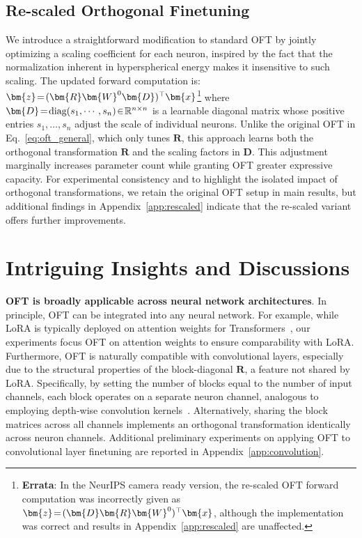 \subsection{Re-scaled Orthogonal Finetuning}

We introduce a straightforward modification to standard OFT by jointly optimizing a scaling coefficient for each neuron, inspired by the fact that the normalization inherent in hyperspherical energy makes it insensitive to such scaling. The updated forward computation is: $\thickmuskip=2mu \medmuskip=2mu\bm{z}=(\bm{R}\bm{W}^0\bm{D})^\top\bm{x}$\footnote{\textbf{Errata}: In the NeurIPS camera ready version, the re-scaled OFT forward computation was incorrectly given as $\thickmuskip=2mu \medmuskip=2mu\bm{z}=(\bm{D}\bm{R}\bm{W}^0)^\top\bm{x}$, although the implementation was correct and results in Appendix~\ref{app:rescaled} are unaffected.} where $\thickmuskip=2mu \medmuskip=2mu\bm{D}=\text{diag}(s_1,\cdots,s_n)\in\mathbb{R}^{n\times n}$ is a learnable diagonal matrix whose positive entries $s_1,\ldots,s_n$ adjust the scale of individual neurons. Unlike the original OFT in Eq.~\eqref{eq:oft_general}, which only tunes $\bm{R}$, this approach learns both the orthogonal transformation $\bm{R}$ and the scaling factors in $\bm{D}$. This adjustment marginally increases parameter count while granting OFT greater expressive capacity. For experimental consistency and to highlight the isolated impact of orthogonal transformations, we retain the original OFT setup in main results, but additional findings in Appendix~\ref{app:rescaled} indicate that the re-scaled variant offers further improvements.

\section{Intriguing Insights and Discussions}

\textbf{OFT is broadly applicable across neural network architectures}. In principle, OFT can be integrated into any neural network. For example, while LoRA is typically deployed on attention weights for Transformers~\cite{hulora2022}, our experiments focus OFT on attention weights to ensure comparability with LoRA. Furthermore, OFT is naturally compatible with convolutional layers, especially due to the structural properties of the block-diagonal $\bm{R}$, a feature not shared by LoRA. Specifically, by setting the number of blocks equal to the number of input channels, each block operates on a separate neuron channel, analogous to employing depth-wise convolution kernels~\cite{chollet2017xception}. Alternatively, sharing the block matrices across all channels implements an orthogonal transformation identically across neuron channels. Additional preliminary experiments on applying OFT to convolutional layer finetuning are reported in Appendix~\ref{app:convolution}.

